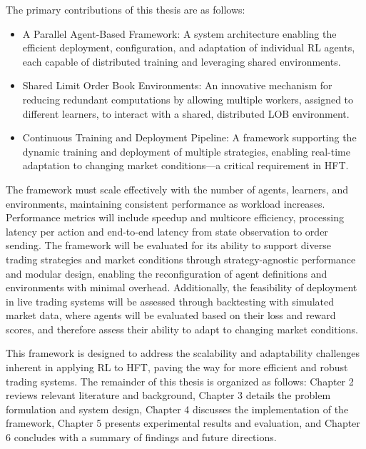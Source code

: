 The primary contributions of this thesis are as follows:

\begin{itemize}
  \item A Parallel Agent-Based Framework: A system architecture enabling the efficient deployment, configuration, and adaptation of individual RL agents, 
    each capable of distributed training and leveraging shared environments.

  \item Shared Limit Order Book Environments: An innovative mechanism for reducing redundant computations by allowing multiple workers, 
    assigned to different learners, to interact with a shared, distributed LOB environment.

  \item Continuous Training and Deployment Pipeline: A framework supporting the dynamic training and deployment of multiple strategies, 
    enabling real-time adaptation to changing market conditions—a critical requirement in HFT.
\end{itemize}


The framework must scale effectively with the number of agents, learners, and environments, maintaining consistent performance as workload increases.
Performance metrics will include speedup and multicore efficiency, processing latency per action and end-to-end latency from state observation to order sending.
The framework will be evaluated for its ability to support diverse trading strategies 
and market conditions through strategy-agnostic performance and modular design, 
enabling the reconfiguration of agent definitions and environments with minimal overhead. 
Additionally, the feasibility of deployment in live trading systems will be assessed through backtesting with simulated market data,
where agents will be evaluated based on their loss and reward scores, and therefore assess their ability to adapt to changing market conditions.

This framework is designed to address the scalability and adaptability challenges inherent in applying RL to HFT, 
paving the way for more efficient and robust trading systems. The remainder of this thesis is organized as follows: 
Chapter 2 reviews relevant literature and background, Chapter 3 details the problem formulation and system design, 
Chapter 4 discusses the implementation of the framework, Chapter 5 presents experimental results and evaluation, 
and Chapter 6 concludes with a summary of findings and future directions.

